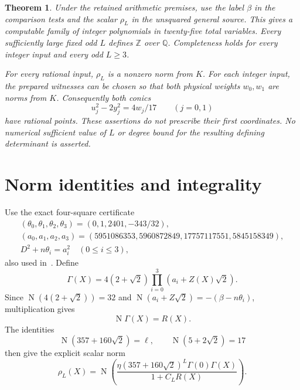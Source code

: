 \documentclass[11pt,a4paper]{article}
\newtheorem{theorem}{Theorem}[section]
\newcommand{\Q}{\mathbb Q}\newcommand{\Z}{\mathbb Z}
\DeclareMathOperator{\Nm}{N}\DeclareMathOperator{\Tr}{Tr}
\begin{document}
\begin{theorem}\label{thm:main}
Under the retained arithmetic premises, use the label $\beta$ in the
comparison tests and the scalar $\rho_L$ in the unsquared general
source. This gives a computable family of integer polynomials in
twenty-five total variables. Every sufficiently large fixed odd $L$
defines $\Z$ over $\Q$. Completeness holds for every integer input
and every odd $L\ge3$.

For every rational input, $\rho_L$ is a nonzero norm from $K$.
For each integer input, the prepared witnesses can be chosen so that
both physical weights $w_0,w_1$ are norms from $K$. Consequently both
conics
\[
                         u_j^2-2y_j^2=4w_j/17\qquad(j=0,1)
\]
have rational points. These assertions do not prescribe their first
coordinates. No numerical sufficient value of $L$ or degree bound for
the resulting defining determinant is asserted.
\end{theorem}

\section{Norm identities and integrality}
Use the exact four-square certificate
\begin{equation}\label{eq:squares}
\begin{gathered}
 (\theta_0,\theta_1,\theta_2,\theta_3)=(0,1,2401,-343/32),\\
 (a_0,a_1,a_2,a_3)
 =(5951086353,5960872849,17757117551,5845158349),\\
                         D^2+n\theta_i=a_i^2\quad(0\le i\le3),
\end{gathered}
\end{equation}
also used in~\cite{NormPreparation}. Define
\[
 \Gamma(X)=4(2+\sqrt2)\prod_{i=0}^3(a_i+Z(X)\sqrt2).
\]
Since $\Nm(4(2+\sqrt2))=32$ and
$\Nm(a_i+Z\sqrt2)=-(\beta-n\theta_i)$, multiplication gives
\begin{equation}\label{eq:normR}
                              \Nm\Gamma(X)=R(X).
\end{equation}
The identities
\[
 \Nm(357+160\sqrt2)=\ell,\qquad \Nm(5+2\sqrt2)=17
\]
then give the explicit scalar norm
\begin{equation}\label{eq:normrho}
 \rho_L(X)=\Nm\left(
   \frac{\eta(357+160\sqrt2)^L\Gamma(0)\Gamma(X)}
        {1+C_LR(X)}\right).
\end{equation}
\end{document}
